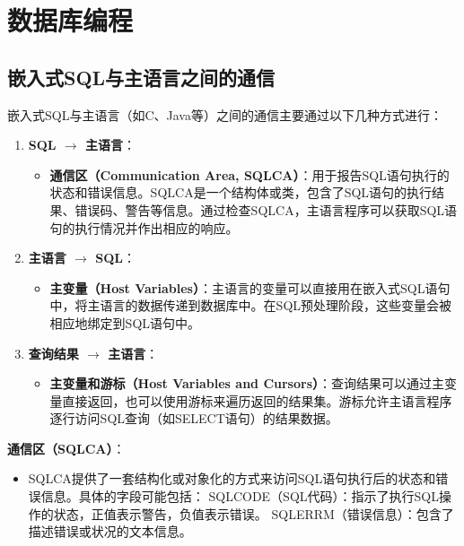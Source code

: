 \section{数据库编程}
\subsection{嵌入式SQL与主语言之间的通信}

嵌入式SQL与主语言（如C、Java等）之间的通信主要通过以下几种方式进行：

\begin{enumerate}
    \item \textbf{SQL $\rightarrow$ 主语言}：
        \begin{itemize}
            \item \textbf{通信区（Communication Area, SQLCA）}：用于报告SQL语句执行的状态和错误信息。SQLCA是一个结构体或类，包含了SQL语句的执行结果、错误码、警告等信息。通过检查SQLCA，主语言程序可以获取SQL语句的执行情况并作出相应的响应。
        \end{itemize}
    
    \item \textbf{主语言 $\rightarrow$ SQL}：
        \begin{itemize}
            \item \textbf{主变量（Host Variables）}：主语言的变量可以直接用在嵌入式SQL语句中，将主语言的数据传递到数据库中。在SQL预处理阶段，这些变量会被相应地绑定到SQL语句中。
        \end{itemize}
    
    \item \textbf{查询结果 $\rightarrow$ 主语言}：
        \begin{itemize}
            \item \textbf{主变量和游标（Host Variables and Cursors）}：查询结果可以通过主变量直接返回，也可以使用游标来遍历返回的结果集。游标允许主语言程序逐行访问SQL查询（如SELECT语句）的结果数据。
        \end{itemize}
\end{enumerate}

\textbf{通信区（SQLCA）}：
\begin{itemize}
    \item SQLCA提供了一套结构化或对象化的方式来访问SQL语句执行后的状态和错误信息。具体的字段可能包括：
        \subitem SQLCODE（SQL代码）：指示了执行SQL操作的状态，正值表示警告，负值表示错误。
        \subitem SQLERRM（错误信息）：包含了描述错误或状况的文本信息。
\end{itemize}

